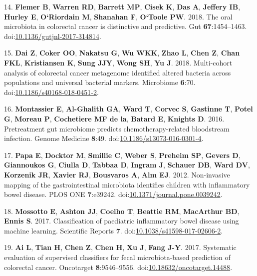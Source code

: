 \documentclass[11pt,]{article}
\begin{document}
\hypertarget{ref-flemer_oral_2018}{}
14. \textbf{Flemer B}, \textbf{Warren RD}, \textbf{Barrett MP},
\textbf{Cisek K}, \textbf{Das A}, \textbf{Jeffery IB}, \textbf{Hurley
E}, \textbf{O`Riordain M}, \textbf{Shanahan F}, \textbf{O`Toole PW}.
2018. The oral microbiota in colorectal cancer is distinctive and
predictive. Gut \textbf{67}:1454--1463.
doi:\href{https://doi.org/10.1136/gutjnl-2017-314814}{10.1136/gutjnl-2017-314814}.

\hypertarget{ref-dai_multi-cohort_2018}{}
15. \textbf{Dai Z}, \textbf{Coker OO}, \textbf{Nakatsu G}, \textbf{Wu
WKK}, \textbf{Zhao L}, \textbf{Chen Z}, \textbf{Chan FKL},
\textbf{Kristiansen K}, \textbf{Sung JJY}, \textbf{Wong SH}, \textbf{Yu
J}. 2018. Multi-cohort analysis of colorectal cancer metagenome
identified altered bacteria across populations and universal bacterial
markers. Microbiome \textbf{6}:70.
doi:\href{https://doi.org/10.1186/s40168-018-0451-2}{10.1186/s40168-018-0451-2}.

\hypertarget{ref-montassier_pretreatment_2016}{}
16. \textbf{Montassier E}, \textbf{Al-Ghalith GA}, \textbf{Ward T},
\textbf{Corvec S}, \textbf{Gastinne T}, \textbf{Potel G}, \textbf{Moreau
P}, \textbf{Cochetiere MF de la}, \textbf{Batard E}, \textbf{Knights D}.
2016. Pretreatment gut microbiome predicts chemotherapy-related
bloodstream infection. Genome Medicine \textbf{8}:49.
doi:\href{https://doi.org/10.1186/s13073-016-0301-4}{10.1186/s13073-016-0301-4}.

\hypertarget{ref-papa_non-invasive_2012}{}
17. \textbf{Papa E}, \textbf{Docktor M}, \textbf{Smillie C},
\textbf{Weber S}, \textbf{Preheim SP}, \textbf{Gevers D},
\textbf{Giannoukos G}, \textbf{Ciulla D}, \textbf{Tabbaa D},
\textbf{Ingram J}, \textbf{Schauer DB}, \textbf{Ward DV},
\textbf{Korzenik JR}, \textbf{Xavier RJ}, \textbf{Bousvaros A},
\textbf{Alm EJ}. 2012. Non-invasive mapping of the gastrointestinal
microbiota identifies children with inflammatory bowel disease. PLOS ONE
\textbf{7}:e39242.
doi:\href{https://doi.org/10.1371/journal.pone.0039242}{10.1371/journal.pone.0039242}.

\hypertarget{ref-mossotto_classification_2017}{}
18. \textbf{Mossotto E}, \textbf{Ashton JJ}, \textbf{Coelho T},
\textbf{Beattie RM}, \textbf{MacArthur BD}, \textbf{Ennis S}. 2017.
Classification of paediatric inflammatory bowel disease using machine
learning. Scientific Reports \textbf{7}.
doi:\href{https://doi.org/10.1038/s41598-017-02606-2}{10.1038/s41598-017-02606-2}.

\hypertarget{ref-ai_systematic_2017}{}
19. \textbf{Ai L}, \textbf{Tian H}, \textbf{Chen Z}, \textbf{Chen H},
\textbf{Xu J}, \textbf{Fang J-Y}. 2017. Systematic evaluation of
supervised classifiers for fecal microbiota-based prediction of
colorectal cancer. Oncotarget \textbf{8}:9546--9556.
doi:\href{https://doi.org/10.18632/oncotarget.14488}{10.18632/oncotarget.14488}.
\end{document}
